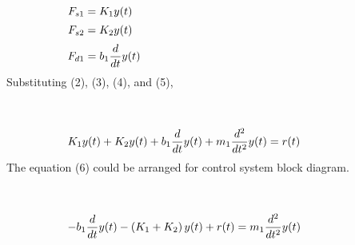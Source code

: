 \documentclass[10pt,a4paper,leqno]{article}
\begin{document}
\begin{CJK*}{UTF8}{gbsn}
\begin{equation}
 \begin{minipage}{250pt}
                \begin{flushleft} $\displaystyle F_{s1} = K_{1} y{\left(t \right)}$  \end{flushleft}
 \end{minipage}
 \end{equation}
\begin{equation}
 \begin{minipage}{250pt}
                \begin{flushleft} $\displaystyle F_{s2} = K_{2} y{\left(t \right)}$  \end{flushleft}
 \end{minipage}
 \end{equation}
\begin{equation}
 \begin{minipage}{250pt}
                \begin{flushleft} $\displaystyle F_{d1} = b_{1} \frac{d}{d t} y{\left(t \right)}$  \end{flushleft}
 \end{minipage}
 \end{equation}
\noindent Substituting (2), (3), (4), and (5),
 \par \ \par\begin{equation}
 \begin{minipage}{250pt}
                \begin{flushleft} $\displaystyle K_{1} y{\left(t \right)} + K_{2} y{\left(t \right)} + b_{1} \frac{d}{d t} y{\left(t \right)} + m_{1} \frac{d^{2}}{d t^{2}} y{\left(t \right)} = r{\left(t \right)}$  \end{flushleft}
 \end{minipage}
 \end{equation}
\noindent The equation (6) could be arranged for control system block diagram.
 \par \ \par\begin{equation}
 \begin{minipage}{250pt}
                \begin{flushleft} $\displaystyle - b_{1} \frac{d}{d t} y{\left(t \right)} - \left(K_{1} + K_{2}\right) y{\left(t \right)} + r{\left(t \right)} = m_{1} \frac{d^{2}}{d t^{2}} y{\left(t \right)}$  \end{flushleft}
 \end{minipage}
 \end{equation}
\noindent \begin{figure}[H]\centering 


\end{figure}
\end{CJK*}
\end{document}
